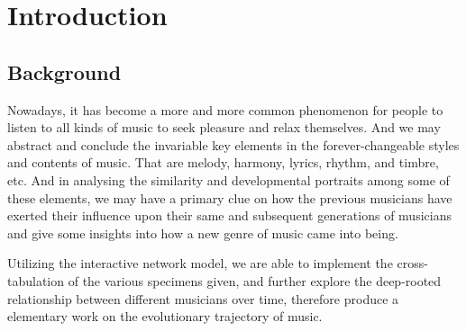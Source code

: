 \documentclass[12pt]{article}
\begin{document}
\section{Introduction}
\subsection{Background}
\quad\;
Nowadays, it has become a more and more common phenomenon for people to listen to all kinds of music to seek pleasure and relax themselves. And we may abstract and conclude the invariable key elements in the forever-changeable styles and contents of music. That are melody, harmony, lyrics, rhythm, and timbre, etc. And in analysing the similarity and developmental portraits among some of these elements, we may have a primary clue on how the previous musicians have exerted their influence upon their same and subsequent generations of musicians and give some insights into how a new genre of music came into being.\par
Utilizing the interactive network model, we are able to implement the cross-tabulation of the various specimens given, and further explore the deep-rooted relationship between different musicians over time, therefore produce a elementary work on the evolutionary trajectory of music.
\end{document}
